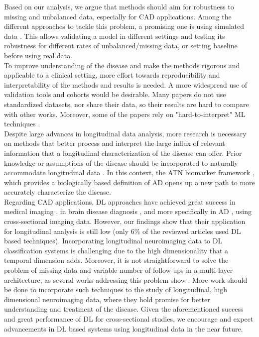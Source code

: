 Based on our analysis, we argue that methods should aim for robustness to missing and unbalanced data, especially for CAD applications. Among the different approaches to tackle this problem, a promising one is using simulated data \cite{Chen2011b,Chen2012,Eshaghi2017,Hyun2016,Li2017b,Li2013,Zhang2014,Ziegler2015b}. This allows validating a model in different settings and testing its robustness for different rates of unbalanced/missing data, or setting baseline before using real data. \\

To improve understanding of the disease and make the methods rigorous and applicable to a clinical setting, more effort towards reproducibility and interpretability of the methods and results is needed. A more widespread use of validation tools and cohorts would be desirable. Many papers do not use standardized datasets, nor share their data, so their results are hard to compare with other works. Moreover, some of the papers rely on "hard-to-interpret" ML techniques \cite{Givon2017,Zhang2017}. \\

Despite large advances in longitudinal data analysis, more research is necessary on methods that better process and interpret the large influx of relevant information that a longitudinal characterization of the disease can offer. Prior knowledge or assumptions of the disease should be incorporated to naturally accommodate longitudinal data \cite{Fonteijn2012,Gavidia-Bovadilla2017,Zhu2016a}. In this context, the ATN biomarker framework \cite{Jack2018}, which provides a biologically based definition of AD opens up a new path to more accurately characterize the disease. \\

Regarding CAD applications, DL approaches have achieved great success in medical imaging \cite{Litjens2017}, in brain disease diagnosis \cite{Talo2019,Talo2019b}, and more specifically in AD \cite{Liu2014,Jo2019}, using cross-sectional imaging data. However, our findings show that their application for longitudinal analysis is still low (only $6\%$ of the reviewed articles used DL based techniques). Incorporating longitudinal neuroimaging data to DL classification systems is challenging due to the high dimensionality that a temporal dimension adds. Moreover, it is not straightforward to solve the problem of missing data and variable number of follow-ups in a multi-layer architecture, as several works addressing this problem show \cite{Givon2017,Ghazi2019}. More work should be done to incorporate such techniques to the study of longitudinal, high dimensional neuroimaging data, where they hold promise for better understanding and treatment of the disease. Given the aforementioned success and great performance of DL for cross-sectional studies, we encourage and expect advancements in DL based systems using longitudinal data in the near future.\\


